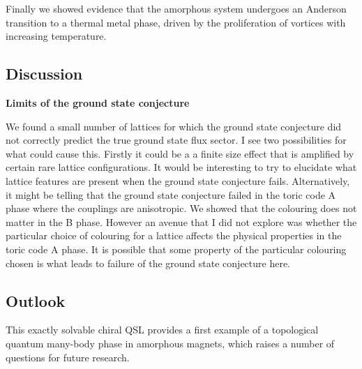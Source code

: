 Finally we showed evidence that the amorphous system undergoes an Anderson transition to a thermal metal phase, driven by the proliferation of vortices with increasing temperature.

\hypertarget{amk-discussion}{%
\subsection{Discussion}\label{amk-discussion}}

\textbf{Limits of the ground state conjecture}

We found a small number of lattices for which the ground state conjecture did not correctly predict the true ground state flux sector. I see two possibilities for what could cause this. Firstly it could be a a finite size effect that is amplified by certain rare lattice configurations. It would be interesting to try to elucidate what lattice features are present when the ground state conjecture fails. Alternatively, it might be telling that the ground state conjecture failed in the toric code A phase where the couplings are anisotropic. We showed that the colouring does not matter in the B phase. However an avenue that I did not explore was whether the particular choice of colouring for a lattice affects the physical properties in the toric code A phase. It is possible that some property of the particular colouring chosen is what leads to failure of the ground state conjecture here.

\hypertarget{amk-outlook}{%
\subsection{Outlook}\label{amk-outlook}}

This exactly solvable chiral QSL provides a first example of a topological quantum many-body phase in amorphous magnets, which raises a number of questions for future research.

